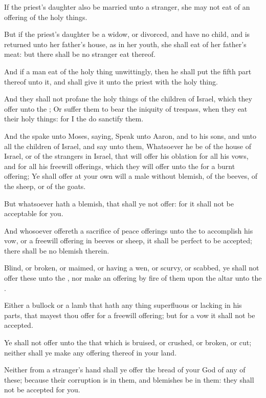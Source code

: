 \verse If the priest's daughter also be married unto a stranger, she may not eat of an offering of the holy things.

\verse But if the priest's daughter be a widow, or divorced, and have no child, and is returned unto her father's house, as in her youth, she shall eat of her father's meat: but there shall be no stranger eat thereof.

\verse And if a man eat of the holy thing unwittingly, then he shall put the fifth part thereof unto it, and shall give it unto the priest with the holy thing.

\verse And they shall not profane the holy things of the children of Israel, which they offer unto the \LORD; \verse Or suffer them to bear the iniquity of trespass, when they eat their holy things: for I the \LORD do sanctify them.

\verse And the \LORD spake unto Moses, saying, \verse Speak unto Aaron, and to his sons, and unto all the children of Israel, and say unto them, Whatsoever he be of the house of Israel, or of the strangers in Israel, that will offer his oblation for all his vows, and for all his freewill offerings, which they will offer unto the \LORD for a burnt offering; \verse Ye shall offer at your own will a male without blemish, of the beeves, of the sheep, or of the goats.

\verse But whatsoever hath a blemish, that shall ye not offer: for it shall not be acceptable for you.

\verse And whosoever offereth a sacrifice of peace offerings unto the \LORD to accomplish his vow, or a freewill offering in beeves or sheep, it shall be perfect to be accepted; there shall be no blemish therein.

\verse Blind, or broken, or maimed, or having a wen, or scurvy, or scabbed, ye shall not offer these unto the \LORD, nor make an offering by fire of them upon the altar unto the \LORD.

\verse Either a bullock or a lamb that hath any thing superfluous or lacking in his parts, that mayest thou offer for a freewill offering; but for a vow it shall not be accepted.

\verse Ye shall not offer unto the \LORD that which is bruised, or crushed, or broken, or cut; neither shall ye make any offering thereof in your land.

\verse Neither from a stranger's hand shall ye offer the bread of your God of any of these; because their corruption is in them, and blemishes be in them: they shall not be accepted for you.

